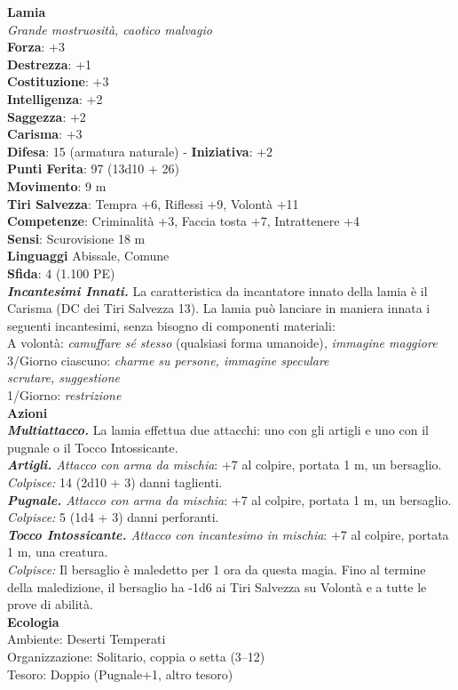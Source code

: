 \begin{multicols}{2}
\medskip\textbf{Lamia}\\
\emph{Grande mostruosità, caotico malvagio}\\
\textbf{Forza}: +3\\
\textbf{Destrezza}: +1\\
\textbf{Costituzione}: +3\\
\textbf{Intelligenza}: +2\\
\textbf{Saggezza}: +2\\
\textbf{Carisma}: +3\\
\textbf{Difesa}: 15 (armatura naturale) - \textbf{Iniziativa}: +2\\
\textbf{Punti Ferita}: 97 (13d10 + 26)\\
\textbf{Movimento}: 9 m\\
\textbf{Tiri Salvezza}: Tempra +6, Riflessi +9, Volontà +11\\
\textbf{Competenze}: Criminalità +3, Faccia tosta +7, Intrattenere +4\\
\textbf{Sensi}: Scurovisione 18 m\\
\textbf{Linguaggi} Abissale, Comune\\
\textbf{Sfida}: 4 (1.100 PE)\smallskip\\
\emph{\textbf{Incantesimi Innati.}} La caratteristica da incantatore innato della lamia è il Carisma (DC dei Tiri Salvezza 13). La lamia può lanciare in maniera innata i seguenti incantesimi, senza bisogno di componenti materiali:\\
A volontà: \emph{camuffare sé stesso} (qualsiasi forma umanoide)\emph{,} \emph{immagine maggiore}\\
3/Giorno ciascuno: \emph{charme su persone, immagine speculare}\\
\emph{scrutare, suggestione}\\
1/Giorno: \emph{restrizione}\\
\smallskip\textbf{Azioni}\\
\emph{\textbf{Multiattacco.}} La lamia effettua due attacchi: uno con gli artigli e uno con il pugnale o il Tocco Intossicante.\\
\emph{\textbf{Artigli.} Attacco con arma da mischia}: +7 al colpire, portata 1 m, un bersaglio.\\
\emph{Colpisce:} 14 (2d10 + 3) danni taglienti.\\
\emph{\textbf{Pugnale.} Attacco con arma da mischia}: +7 al colpire, portata 1 m, un bersaglio.\\
\emph{Colpisce:} 5 (1d4 + 3) danni perforanti.\\
\emph{\textbf{Tocco Intossicante.} Attacco con incantesimo in mischia}: +7 al colpire, portata 1 m, una creatura.\\
\emph{Colpisce:} Il bersaglio è maledetto per 1 ora da questa magia. Fino al termine della maledizione, il bersaglio ha -1d6 ai Tiri Salvezza su Volontà e a tutte le prove di abilità.\\
\textbf{Ecologia}\\
Ambiente: Deserti Temperati\\
Organizzazione: Solitario, coppia o setta (3–12)\\
Tesoro: Doppio (Pugnale+1, altro tesoro)\\


\end{multicols}
